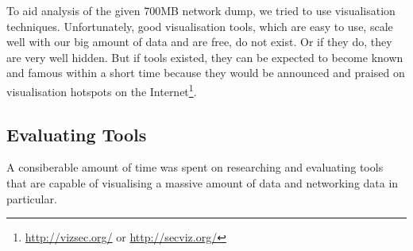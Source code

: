 \documentclass[a4paper,
    11pt,
    normalheadings,
    parindent,
    UKenglish,
    abstracton,
    ]{scrartcl}
\begin{document}
To aid analysis of the given 700MB network dump, we tried to use visualisation techniques.
Unfortunately, good visualisation tools, which are easy to use, scale well with our big amount of data and are free, do not exist.
Or if they do, they are very well hidden.
But if tools existed, they can be expected to become known and famous within a short time because they would be announced and praised on visualisation hotspots on the Internet\footnote{\url{http://vizsec.org/} or \url{http://secviz.org/}}.

\subsection{Evaluating Tools}
A consiberable amount of time was spent on researching and evaluating tools that are capable of visualising a massive amount of data and networking data in particular.
\end{document}
